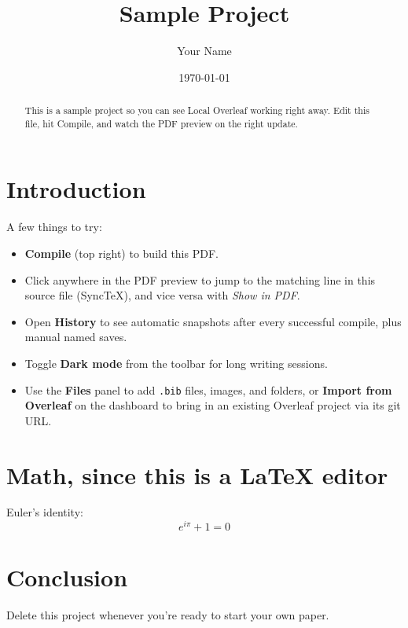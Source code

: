 \documentclass{article}
\title{Sample Project}
\author{Your Name}
\date{\today}
\begin{document}
\maketitle

\begin{abstract}
This is a sample project so you can see Local Overleaf working right away.
Edit this file, hit Compile, and watch the PDF preview on the right update.
\end{abstract}

\section{Introduction}
A few things to try:
\begin{itemize}
  \item \textbf{Compile} (top right) to build this PDF.
  \item Click anywhere in the PDF preview to jump to the matching line in this
    source file (SyncTeX), and vice versa with \emph{Show in PDF}.
  \item Open \textbf{History} to see automatic snapshots after every
    successful compile, plus manual named saves.
  \item Toggle \textbf{Dark mode} from the toolbar for long writing sessions.
  \item Use the \textbf{Files} panel to add \texttt{.bib} files, images, and
    folders, or \textbf{Import from Overleaf} on the dashboard to bring in an
    existing Overleaf project via its git URL.
\end{itemize}

\section{Math, since this is a LaTeX editor}
Euler's identity:
\[
  e^{i\pi} + 1 = 0
\]

\section{Conclusion}
Delete this project whenever you're ready to start your own paper.
\end{document}
